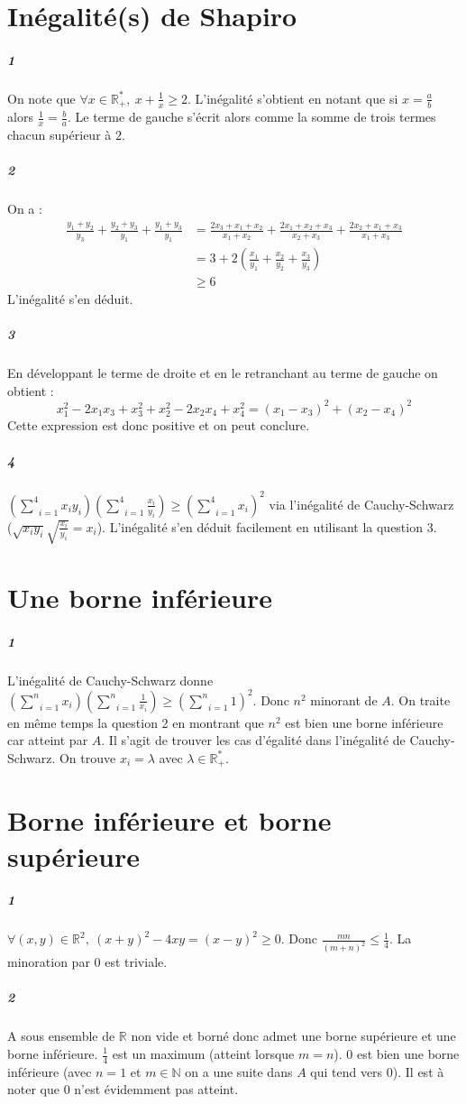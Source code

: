 \documentclass[10pt,a4paper]{article}
\begin{document}
\section{Inégalité(s) de Shapiro}
\subparagraph{1}On note que $\forall x \in \mathbb{R}_+^*, \ x+\frac{1}{x} \ge 2$. L'inégalité s'obtient en notant que si $x=\frac{a}{b}$ alors $\frac{1}{x}=\frac{b}{a}$. Le terme de gauche s'écrit alors comme la somme de trois termes chacun supérieur à $2$.
\subparagraph{2}On a :
\begin{equation}
\begin{aligned}
\frac{y_1+y_2}{y_3}+\frac{y_2+y_3}{y_1}+\frac{y_1+y_3}{y_1}&=\frac{2x_3+x_1+x_2}{x_1+x_2}+\frac{2x_1+x_2+x_3}{x_2+x_3}+\frac{2x_2+x_1+x_3}{x_1+x_3}\\
&=3+2 \left(\frac{x_1}{y_1}+\frac{x_2}{y_2}+\frac{x_3}{y_3}\right)\\
&\ge 6
\end{aligned}
\end{equation}
L'inégalité s'en déduit.
\subparagraph{3}En développant le terme de droite et en le retranchant au terme de gauche on obtient :
\begin{equation}
x_1^2-2x_1x_3+x_3^2+x_2^2-2x_2x_4+x_4^2=(x_1-x_3)^2+(x_2-x_4)^2
\end{equation}
Cette expression est donc positive et on peut conclure.
\subparagraph{4}$ \left( \underset{i=1}{\overset{4}{\sum}}x_i y_i \right)\left( \underset{i=1}{\overset{4}{\sum}}\frac{x_i}{y_i} \right)\ge \left(\underset{i=1}{\overset{4}{\sum}}x_i \right)^2$ via l'inégalité de Cauchy-Schwarz ($\sqrt{x_iy_i} \sqrt{\frac{x_i}{y_i}}=x_i$). L'inégalité s'en déduit facilement en utilisant la question 3.


\section{Une borne inférieure}
\subparagraph{1}L'inégalité de Cauchy-Schwarz donne $\left(\underset{i=1}{\overset{n}{\sum}} x_i \right)\left(\underset{i=1}{\overset{n}{\sum}} \frac{1}{x_i} \right)\ge \left(\underset{i=1}{\overset{n}{\sum}} 1\right)^2$. Donc $n^2$ minorant de $A$. On traite en même temps la question 2 en montrant que $n^2$ est bien une borne inférieure car atteint par $A$. Il s'agit de trouver les cas d'égalité dans l'inégalité de Cauchy-Schwarz. On trouve $x_i= \lambda$ avec $\lambda \in \mathbb{R}_+^*$.

\section{Borne inférieure et borne supérieure}
\subparagraph{1}$\forall (x,y) \in \mathbb{R}^2, \ (x+y)^2-4xy=(x-y)^2 \ge 0$. Donc $\frac{mn}{(m+n)^2}\le \frac{1}{4}$. La minoration par $0$ est triviale.
\subparagraph{2}A sous ensemble de $\mathbb{R}$ non vide et borné donc admet une borne supérieure et une borne inférieure. $\frac{1}{4}$ est un maximum (atteint lorsque $m=n$). $0$ est bien une borne inférieure (avec $n=1$ et $m \in \mathbb{N}$ on a une suite dans $A$ qui tend vers $0$). Il est à noter que $0$ n'est évidemment pas atteint.
\end{document}

